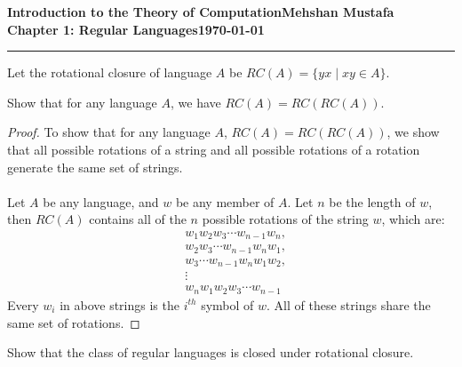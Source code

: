 \documentclass[11pt]{article}
\newcommand{\myname}{Mehshan Mustafa}
\newcommand{\dated}{\today}
\newenvironment{problem}[2][Problem]{\begin{trivlist}
\item[\hskip \labelsep {\bfseries #1}\hskip \labelsep {\bfseries #2.}]}{\end{trivlist}}
\begin{document}
\textbf{Introduction to the Theory of
Computation}\hfill\textbf{\myname}\\[0.01in]
\textbf{Chapter 1: Regular Languages}\hfill\textbf{\dated}\\
\smallskip\hrule\bigskip

\begin{problem}{1.67}
Let the rotational closure of language $A$ be $RC(A) = \{yx \; | \; xy \in A\}$.
\end{problem}

\begin{problem}[Part]{a}
Show that for any language $A$, we have $RC(A) = RC(RC(A))$.
\end{problem}

\begin{proof}
To show that for any language $A$, $RC(A) = RC(RC(A))$, we show that all possible rotations of a string and all possible rotations of a rotation generate the same set of strings.
\\
\\
Let $A$ be any language, and $w$ be any member of $A$. Let $n$ be the length of $w$, then $RC(A)$ contains all of the $n$ possible rotations of the string $w$, which are:
\begin{align*}
&w_{1} w_{2} w_{3} \cdots w_{n-1} w_{n}, \\
&w_{2} w_{3} \cdots w_{n-1} w_{n} w_{1}, \\
&w_{3} \cdots w_{n-1} w_{n} w_{1} w_{2}, \\
&\vdots \\
&w_{n} w_{1} w_{2} w_{3} \cdots w_{n-1}
\end{align*}
Every  $w_{i}$ in above strings is the $i^{th}$ symbol of $w$. All of these strings share the same set of rotations.
\end{proof}

\newpage 

\begin{problem}[Part]{b}
Show that the class of regular languages is closed under rotational closure.
\end{problem}
\end{document}
